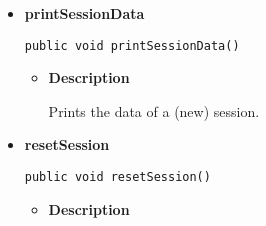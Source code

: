 {{{{{\begin{itemize}
{\begin{itemize}
{Prints a message to the console.
}
\item{
{\bf  Parameters}
  \begin{itemize}
   \item{
\texttt{message} -- the message.}
   \item{
\texttt{type} -- 1 is debug (only printed in debug mode), 2 for errors, everything else a status.}
  \end{itemize}
}%
\end{itemize}
}%
\item{ 
\hypertarget{filetransferUDP.FileTransfer.printSessionData()}{{\bf  printSessionData}\\}
\begin{lstlisting}[frame=none]
public void printSessionData()\end{lstlisting} %
\begin{itemize}
\item{
{\bf  Description}

Prints the data of a (new) session.
}
\end{itemize}
}%
\item{ 
\hypertarget{filetransferUDP.FileTransfer.resetSession()}{{\bf  resetSession}\\}
\begin{lstlisting}[frame=none]
public void resetSession()\end{lstlisting} %
\begin{itemize}
\item{
{\bf  Description}

}
\end{itemize}}
\end{itemize}}}}}}
